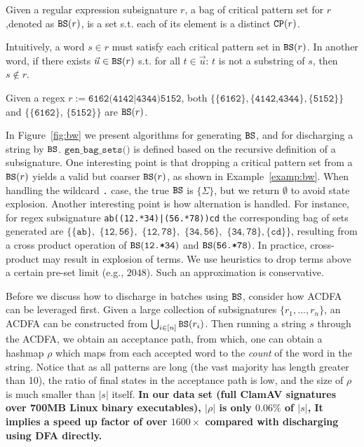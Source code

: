\begin{definition} \label{deff:bw} Given a regular expression
subsignature $r$, a bag of critical pattern set for $r$,denoted as
$\texttt{BS}(r)$, is a set s.t.  each of its element is a distinct $\texttt{CP}(r)$.  
\end{definition}


Intuitively, a word $s \in r$ must
satisfy each critical pattern set in $\texttt{BS}(r)$.
In another word,
if there exists $\vec{u} \in \texttt{BS}(r)$ s.t. 
for all $t\in \vec{u}$: $t$ is not a substring
of $s$, then $s \not\in r$.

\begin{example} \label{examp:bw} 
Given a regex $r := \texttt{6162(4142|4344)5152}$,
both $\texttt{\{\{6162\}$, $\{4142,4344\}$, $\{5152\}}\}$ and
$\texttt{\{\{6162\}, \{5152\}\}}$ are $\texttt{BS}(r)$.
\end{example}


In Figure\ \ref{fig:bw} we present algorithms for generating $\texttt{BS}$,
and for discharging a string by $\texttt{BS}$. 
$\texttt{gen\_bag\_sets()}$
is defined based on the recursive definition of a subsignature.
One interesting point is that dropping a critical pattern set 
from a $\texttt{BS}(r)$ yields a valid but coarser $\texttt{BS}(r)$,
as shown in Example\ \ref{examp:bw}. 
When handling the wildcard \texttt{.} case, the true $\texttt{BS}$ 
is $\{\Sigma\}$, but we return $\emptyset$ to avoid state explosion.
Another interesting point is how alternation is handled. For instance,
for regex subsignature \texttt{ab((12.*34)|(56.*78))cd} the corresponding 
bag of sets generated are $\{\{\texttt{ab}\},$ $\{\texttt{12}, \texttt{56}\},$ 
$\{\texttt{12}, \texttt{78}\},$ $\{\texttt{34}, \texttt{56}\},$ 
$\{\texttt{34}, \texttt{78}\}, \{\texttt{cd}\}\}$,
resulting from a cross product operation of 
$\texttt{BS}(\texttt{12.*34})$ and
$\texttt{BS}(\texttt{56.*78})$. 
In practice, cross-product may result in explosion of terms.
We use heuristics to drop terms above a certain pre-set limit (e.g., $2048$). 
Such an approximation is conservative.

Before we discuss how to discharge in batches using $\texttt{BS}$, 
consider how ACDFA can be leveraged first. 
Given a large collection of subsignatures $\{r_1, ..., r_n\}$,
an ACDFA can be constructed from $\bigcup_{i\in[n]} \texttt{BS}(r_i)$.
Then running a string $s$ through the ACDFA, we obtain
an acceptance path, from which, one can obtain a hashmap $\rho$ which
maps from each accepted word to the {\em count} of the word in the string.
Notice that as all patterns are long (the vast majority has length
greater than 10), the ratio of final states 
in the acceptance path is low, and the size of $\rho$
is much smaller than $|s|$ itself. {\bf In our data set (full
ClamAV signatures over 700MB Linux binary executables),
$|\rho|$ is only $0.06\%$ of $|s|$,
It implies a speed up factor of over $1600\times$ compared with
discharging using DFA directly.}

